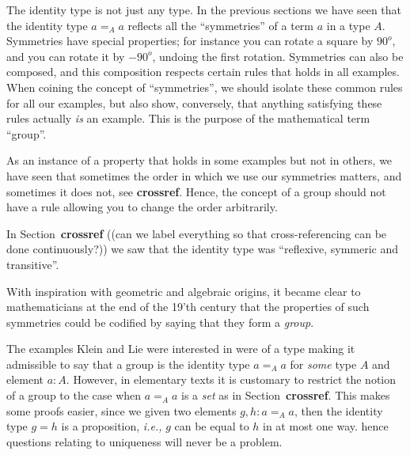 \newcommand{\ie}{{\em i.e., }}%
\newcommand{\defequi}{:\equiv}%
\newcommand{\refer}{{\bf crossref}}%
The identity type is not just any type.  In the previous sections we have seen that the identity type $a=_Aa$ reflects all the ``symmetries'' of a term $a$ in a type $A$.  Symmetries have special properties; for instance you can rotate a square by $90^o$, and you can rotate it by $-90^o$, undoing the first rotation.  
Symmetries can also be composed, and this composition respects certain rules that holds in all examples.  When coining the concept of ``symmetries'', we should isolate these common rules for all our examples, but also show, conversely, that anything satisfying these rules actually {\em is} an example.  This is the purpose of the mathematical term ``group''. 

As an instance of a property that holds in some examples but not in others, we have seen that sometimes the order in which we use our symmetries matters, and sometimes it does not, see \refer{}.  Hence, the concept of a group should not have a rule allowing you to change the order arbitrarily.

In Section~\refer{} ((can we label everything so that cross-referencing can be done continuously?)) we saw that the identity type was ``reflexive, symmeric and transitive''.  

With inspiration with geometric and algebraic origins, it became clear to mathematicians at the end of the 19'th century that the properties of such symmetries could be codified by saying that they form a {\em group}. 

The examples Klein and Lie were interested in were of a type making it admissible to say that a group is the identity type $a=_Aa$ for {\em some} type $A$ and element $a:A$.  
However, in elementary texts it is customary to restrict the notion of a group to the case when $a=_Aa$ is a {\em set} as in Section~\refer{}.  This makes some proofs easier, since we given two elements $g,h:a=_Aa$, then the identity type $g=h$ is a proposition, \ie $g$ can be equal to $h$ in at most one way.  hence questions relating to uniqueness will never be a problem.


